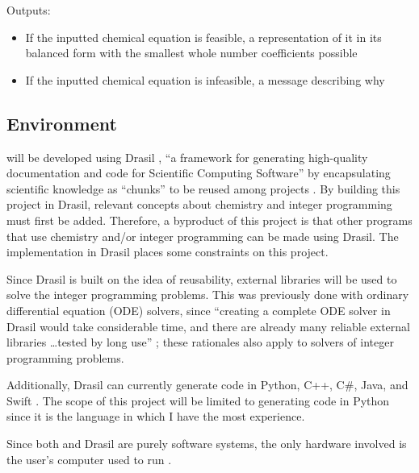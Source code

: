 \documentclass{article}
\begin{document}
\noindent Outputs:

\begin{itemize}
	\item If the inputted chemical equation is feasible, a representation of it
	      in its balanced form with the smallest whole number coefficients
	      possible
	\item If the inputted chemical equation is infeasible, a message
	      describing why
\end{itemize}

\subsection{Environment} \label{env}

\progname{} will be developed using Drasil
\cite{carette_drasil_2021}, ``a framework for generating
high-quality documentation and code for Scientific Computing Software''
\cite[p. iii]{maclachlan_design_2020} by encapsulating scientific knowledge as
``chunks'' to be reused among projects \cite{maclachlan_design_2020}. By
building this project in Drasil, relevant concepts about chemistry and integer
programming must first be added. Therefore, a byproduct of this project is that
other programs that use chemistry and/or integer programming can be made using
Drasil. The implementation in Drasil places some constraints on this project.

Since Drasil is built on the idea of reusability, external libraries will be
used to solve the integer programming problems. This was previously done with
ordinary differential equation (ODE) solvers, since ``creating a complete ODE
solver in Drasil would take considerable time, and there are already many
reliable external libraries \dots tested by long use''
\cite[p. 24]{chen_solving_2022}; these rationales also apply to solvers of
integer programming problems.

Additionally, Drasil can currently generate code in Python, C++, C\#, Java, and
Swift \cite{chen_solving_2022}. The scope of this project will be limited to
generating code in Python since it is the language in which I
have the most experience.

Since both \progname{} and Drasil are purely software systems, the only
hardware involved is the user's computer used to run \progname{}.
\end{document}
